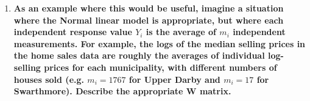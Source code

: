 \documentclass[11pt]{article}
\newenvironment{solution}
  {\renewcommand\qedsymbol{$\blacksquare$}\begin{proof}[Solution]}
  {\end{proof}}
\begin{document}
\begin{enumerate}
\begin{enumerate}
\begin{solution}
		Similarly,
		\begin{align*}
			\mathrm{Var} \left[\hat{\bm{\beta}} \right] &= \mathrm{Var} \left[ (\bm{X}^T \bm{WX})^{-1} \bm{X}^T \bm{W} \bm{Y} \right] \\
			&= (\bm{X}^T \bm{WX})^{-1} \bm{X}^T \bm{W} \,\mathrm{Var} \left[Y \right] ((\bm{X}^T \bm{WX})^{-1} \bm{X}^T \bm{W})^T \\
			&= (\bm{X}^T \bm{WX})^{-1} \bm{X}^T \bm{W} \sigma^2 \bm{W}^{-1} ((\bm{X}^T \bm{WX})^{-1} \bm{X}^T \bm{W})^T \\
			&= \sigma^2 (\bm{X}^T \bm{WX})^{-1} \bm{X}^T \bm{W} \bm{W}^{-1}\bm{W}^T\bm{X} ((\bm{X}^T \bm{WX})^{-1})^T \\\
			&= \sigma^2 (\bm{X}^T \bm{WX})^{-1} \bm{X}^T \bm{W}\bm{X} ((\bm{X}^T \bm{WX})^{-1})^T \\
			&= \sigma^2 (\bm{X}^T \bm{WX})^{-1}.
		\end{align*}
		Thus, we find that the sampling distribution for $\bm{\hat{\beta}}$ is
		\[
			\boxed{\bm{\hat{\beta}} \mid \bm{\beta}, \sigma^2 \sim N_p(\bm{\beta}, \sigma^2(\bm{X}^T\bm{WX})^{-1})}. \, \qedhere
		\]
	  \end{solution}
		
      \item \textbf{As an example where this would be useful, imagine a situation where the Normal linear model is appropriate, 
      but where each independent response value $Y_i$ is the average of $m_i$ independent measurements. For example, the logs of the median
      selling prices in the home sales data are roughly the averages of individual log-selling prices for each municipality, with different numbers
      of houses sold (e.g. $m_i = 1767$ for Upper Darby and $m_i = 17$ for Swarthmore). Describe the appropriate $\bm{W}$ matrix.}
    \end{enumerate}
\end{enumerate}
\end{document}
